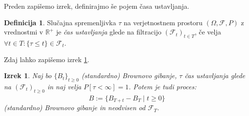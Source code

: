 \documentclass[11pt]{article}
\theoremstyle{plain}
\newtheorem{izrek}{Izrek}
\theoremstyle{definition}
\newtheorem{definicija}{Definicija}
\newcommand{\f}{\mathcal{F}}
\begin{document}
    Preden zapišemo izrek, definirajmo še pojem časa ustavljanja.
    
    \begin{definicija}
    Slučajna spremenljivka $\tau$ na verjetnostnem prostoru $ (\Omega, \f, P )$ z vrednostmi v $\mathbb{R}^{+}$
    je \textit{čas ustavljanja} glede na filtracijo $ (\f_t )_{t \in T} $, če velja $\forall t \in T:\{\tau \leq t\} \in \f_t $.
    \end{definicija}
    
    Zdaj lahko zapišemo izrek \ref{thm:stopped_brownian}. %
    
    \begin{izrek}
        \label{thm:stopped_brownian}
    Naj bo $\{B_t\}_{t \geq 0}$ (standardno) Brownovo gibanje, $\tau$ čas ustavljanja glede na 
    $ (\f_t )_{t \geq 0}$ in naj velja $P[\tau < \infty] =1$.
    Potem je tudi proces:
    \[
    \hat{B} := \{B_{T+t} - B_T \mid t \geq 0\}
    \]
    (standardno) Brownovo gibanje in neodvisen od $\f_T$.
    
    \end{izrek}

    
    
\end{document}
